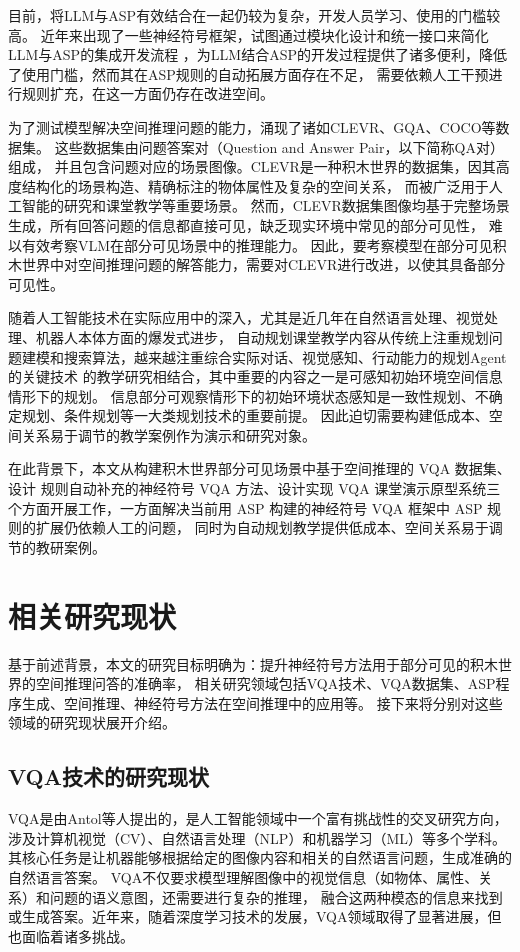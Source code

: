 目前，将LLM与ASP有效结合在一起仍较为复杂，开发人员学习、使用的门槛较高。
近年来出现了一些神经符号框架，试图通过模块化设计和统一接口来简化LLM与ASP的集成开发流程\cite{wang2024dspybasedneuralsymbolicpipelineenhance}
，为LLM结合ASP的开发过程提供了诸多便利，降低了使用门槛，然而其在ASP规则的自动拓展方面存在不足，
需要依赖人工干预进行规则扩充，在这一方面仍存在改进空间。

为了测试模型解决空间推理问题的能力，涌现了诸如CLEVR、GQA、COCO等数据集。
这些数据集由问题答案对（Question and Answer Pair，以下简称QA对）组成，
并且包含问题对应的场景图像。CLEVR是一种积木世界的数据集，因其高度结构化的场景构造、精确标注的物体属性及复杂的空间关系，
而被广泛用于人工智能的研究和课堂教学等重要场景。
然而，CLEVR数据集图像均基于完整场景生成，所有回答问题的信息都直接可见，缺乏现实环境中常见的部分可见性，
难以有效考察VLM在部分可见场景中的推理能力\cite{sam-abraham-etal-2024-clevr}。
因此，要考察模型在部分可见积木世界中对空间推理问题的解答能力，需要对CLEVR进行改进，以使其具备部分可见性。

随着人工智能技术在实际应用中的深入，尤其是近几年在自然语言处理、视觉处理、机器人本体方面的爆发式进步，
自动规划课堂教学内容从传统上注重规划问题建模和搜索算法，越来越注重综合实际对话、视觉感知、行动能力的规划Agent的关键技术\cite{10.5555/3073924}\cite{gao2025multimodalagenttuningbuilding}
的教学研究相结合，其中重要的内容之一是可感知初始环境空间信息情形下的规划。
信息部分可观察情形下的初始环境状态感知是一致性规划、不确定规划、条件规划等一大类规划技术的重要前提。
因此迫切需要构建低成本、空间关系易于调节的教学案例作为演示和研究对象。

在此背景下，本文从构建积木世界部分可见场景中基于空间推理的 VQA 数据集、设计
规则自动补充的神经符号 VQA 方法、设计实现 VQA 课堂演示原型系统三个方面开展工作，一方面解决当前用 ASP 构建的神经符号 VQA 框架中 ASP 规则的扩展仍依赖人工的问题，
同时为自动规划教学提供低成本、空间关系易于调节的教研案例。
\section{相关研究现状}
基于前述背景，本文的研究目标明确为：提升神经符号方法用于部分可见的积木世界的空间推理问答的准确率，
相关研究领域包括VQA技术、VQA数据集、ASP程序生成、空间推理、神经符号方法在空间推理中的应用等。
接下来将分别对这些领域的研究现状展开介绍。
\subsection{VQA技术的研究现状}
VQA是由Antol等人\cite{Antol2015VQA}提出的，是人工智能领域中一个富有挑战性的交叉研究方向，
涉及计算机视觉（CV）、自然语言处理（NLP）和机器学习（ML）等多个学科。
其核心任务是让机器能够根据给定的图像内容和相关的自然语言问题，生成准确的自然语言答案。
VQA不仅要求模型理解图像中的视觉信息（如物体、属性、关系）和问题的语义意图，还需要进行复杂的推理，
融合这两种模态的信息来找到或生成答案。近年来，随着深度学习技术的发展，VQA领域取得了显著进展，但也面临着诸多挑战。

